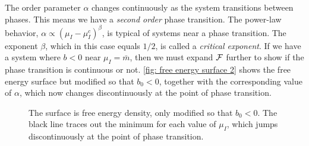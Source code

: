 The order parameter $\alpha$ changes continuously as the system transitions between phases.
This means we have a \emph{second order} phase transition.
The power-law behavior, $\alpha \propto (\mu_I - \mu_I^c)^\beta$, is typical of systems near a phase transition.
The exponent $\beta$, which in this case equals $1/2$, is called a \emph{critical exponent}.
If we have a system where $b < 0$ near $\mu_I = \bar m$, then we must expand $\mathcal{F}$ further to show if the phase transition is continuous or not.
\autoref{fig: free energy surface 2} shows the free energy surface but modified so that $b_0 < 0$, together with the corresponding value of $\alpha$, which now changes discontinuously at the point of phase transition.

\begin{figure}[h]
    \centering
    \caption{The surface is free energy density, only modified so that $b_0<0$. The black line traces out the minimum for each value of $\mu_I$, which jumps discontinuously at the point of phase transition.}
    \label{fig:free energy surface 2}
\end{figure}


